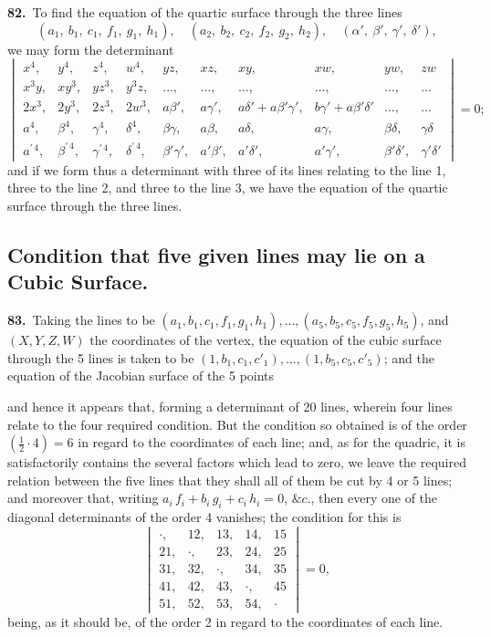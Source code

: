 \documentclass[11pt,a4paper]{article}
\begin{document}
\noindent\textbf{82.}\ To find the equation of the quartic surface through the three lines
\[
(a_1,\ b_1,\ c_1,\ f_1,\ g_1,\ h_1),\quad (a_2,\ b_2,\ c_2,\ f_2,\ g_2,\ h_2),\quad (\alpha',\ \beta',\ \gamma',\ \delta'),
\]
we may form the determinant
\[
\renewcommand{\arraystretch}{1.3}
\begin{vmatrix}
x^4, & y^4, & z^4, & w^4, & yz, & xz, & xy, & xw, & yw, & zw\\
x^3y, & xy^3, & yz^3, & y^3z, & \ldots, & \ldots, & \ldots, & \ldots, & \ldots, & \ldots\\
2x^3, & 2y^3, & 2z^3, & 2w^3, & a\beta', & a\gamma', & a\delta' + a\beta'\gamma', & b\gamma' + a\beta'\delta' & \ldots, & \ldots\\
a^4, & \beta^4, & \gamma^4, & \delta^4, & \beta\gamma, & a\beta, & a\delta, & a\gamma, & \beta\delta, & \gamma\delta\\
a^{\prime\,4}, & \beta^{\prime\,4}, & \gamma^{\prime\,4}, & \delta^{\prime\,4}, & \beta'\gamma', & a'\beta', & a'\delta', & a'\gamma', & \beta'\delta', & \gamma'\delta'
\end{vmatrix} = 0;
\]
and if we form thus a determinant with three of its lines relating to the line 1, three to the line 2, and three to the line 3, we have the equation of the quartic surface through the three lines.

\subsection*{Condition that five given lines may lie on a Cubic Surface.}

\noindent\textbf{83.}\ Taking the lines to be $(a_1, b_1, c_1, f_1, g_1, h_1), \ldots, (a_5, b_5, c_5, f_5, g_5, h_5)$, and $(X, Y, Z, W)$ the coordinates of the vertex, the equation of the cubic surface through the 5 lines is taken to be $(1, b_1, c_1, c'_1), \ldots, (1, b_5, c_5, c'_5)$; and the equation of the Jacobian surface of the 5 points

\newpage
\setcounter{page}{166}

\noindent and hence it appears that, forming a determinant of 20 lines, wherein four lines relate to the four required condition. But the condition so obtained is of the order $(\tfrac{1}{2}\cdot 4) = 6$ in regard to the coordinates of each line; and, as for the quadric, it is satisfactorily contains the several factors which lead to zero, we leave the required relation between the five lines that they shall all of them be cut by 4 or 5 lines; and moreover that, writing $a_i\, f_i + b_i\, g_i + c_i\, h_i = 0$, $\&c.$, then every one of the diagonal determinants of the order 4 vanishes; the condition for this is
\[
\begin{vmatrix}
\cdot, & 12, & 13, & 14, & 15\\
21, & \cdot, & 23, & 24, & 25\\
31, & 32, & \cdot, & 34, & 35\\
41, & 42, & 43, & \cdot, & 45\\
51, & 52, & 53, & 54, & \cdot
\end{vmatrix} = 0,
\]
being, as it should be, of the order 2 in regard to the coordinates of each line.
\end{document}
